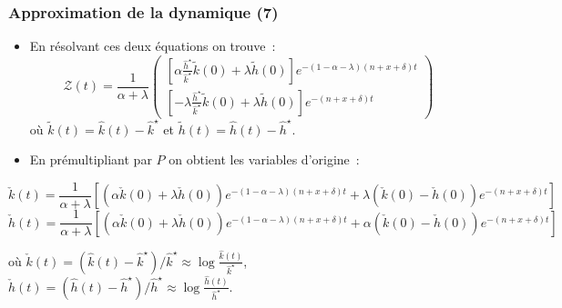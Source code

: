 \documentclass[10pt,notheorems]{beamer}
\theoremstyle{plain}
\theoremstyle{definition} %
\begin{document}
\begin{frame}
  \frametitle{Approximation de la dynamique (7)}

  \begin{itemize}

  \item En résolvant ces deux équations on trouve~:
    \[
      \mathcal Z(t) =
      \frac{1}{\alpha+\lambda}
      \begin{pmatrix}
        \left[\alpha\frac{\hat h^\star}{\hat k^\star}\tilde k(0)+\lambda \tilde h(0)\right]e^{-(1-\alpha-\lambda)(n+x+\delta)t}\\
        \left[-\lambda\frac{\hat h^\star}{\hat k^\star}\tilde k(0)+\lambda \tilde h(0) \right]e^{-(n+x+\delta)t}
      \end{pmatrix}
    \]
    où $\tilde k(t) = \hat k(t)-\hat k^\star$ et $\tilde h(t) = \hat h(t)-\hat h^\star$.\newline

  \item En prémultipliant par $P$ on obtient les variables d'origine~:

  \end{itemize}

  {\small
    \[
      \check{k}(t) = \frac{1}{\alpha+\lambda}\left[\left(\alpha \check{k}(0)+\lambda \check{h}(0)\right)e^{-(1-\alpha-\lambda)(n+x+\delta)t}+\lambda \left(\check{k}(0)-\check{h}(0)\right)e^{-(n+x+\delta)t}\right]
    \]
    \[
      \check{h}(t) = \frac{1}{\alpha+\lambda}\left[\left(\alpha \check{k}(0)+\lambda \check{h}(0)\right)e^{-(1-\alpha-\lambda)(n+x+\delta)t} + \alpha \left(\check{k}(0)-\check{h}(0)\right)e^{-(n+x+\delta)t}\right]
    \]
  }

  \medskip

  où $\check{k}(t) = (\hat k(t)-\hat k^{\star})/\hat k^{\star} \approx \log \frac{\hat k(t)}{\hat k^{\star}}$,
  $\check{h}(t) = (\hat h(t)-\hat h^{\star})/\hat h^{\star} \approx \log \frac{\hat h(t)}{\hat h^{\star}}$.

\end{frame}
\end{document}
